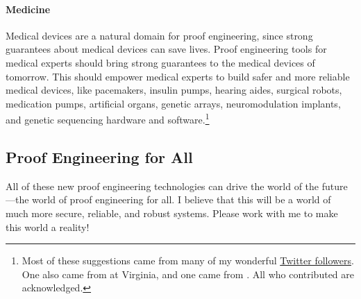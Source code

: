 \paragraph{Medicine} 
Medical devices are a natural domain for proof engineering, since strong guarantees about medical devices can save lives.
Proof engineering tools for medical experts should bring strong guarantees to the medical devices of tomorrow.
This should empower medical experts to build safer and more reliable medical devices,
like pacemakers, insulin pumps, hearing aides, surgical robots, medication pumps, artificial organs,
genetic arrays, neuromodulation implants, and genetic sequencing hardware and 
software.\footnote{Most of these suggestions came from many of my wonderful \href{https://twitter.com/TaliaRinger/status/1388282607926857731}{Twitter followers}.
One also came from  at Virginia, and one came from . All who contributed are acknowledged.}


\subsection*{Proof Engineering for All}

All of these new proof engineering technologies can drive the world of the future---the world of proof engineering for all.
I believe that this will be a world of much more secure, reliable, and robust systems.
Please work with me to make this world a reality!

